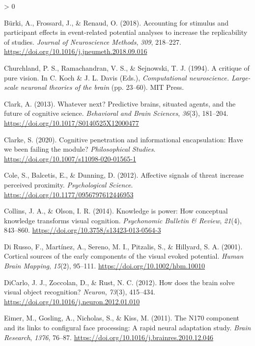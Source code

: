 \documentclass[
  english,
  man,floatsintext]{apa7}
\newlength{\cslhangindent}
\newenvironment{CSLReferences}[2] %
 {%
  \setlength{\parindent}{0pt}
  \ifodd #1 \everypar{\setlength{\hangindent}{\cslhangindent}}\ignorespaces\fi
  \ifnum #2 > 0
  \setlength{\parskip}{#2\baselineskip}
  \fi
 }%
 {}
\begin{document}
\begin{CSLReferences}{1}{0}
\leavevmode\hypertarget{ref-buxfcrki2018}{}%
Bürki, A., Frossard, J., \& Renaud, O. (2018). Accounting for stimulus and participant effects in event-related potential analyses to increase the replicability of studies. \emph{Journal of Neuroscience Methods}, \emph{309}, 218--227. \url{https://doi.org/10.1016/j.jneumeth.2018.09.016}

\leavevmode\hypertarget{ref-churchland1994}{}%
Churchland, P. S., Ramachandran, V. S., \& Sejnowski, T. J. (1994). A critique of pure vision. In C. Koch \& J. L. Davis (Eds.), \emph{Computational neuroscience. Large-scale neuronal theories of the brain} (pp. 23--60). MIT Press.

\leavevmode\hypertarget{ref-clark2013}{}%
Clark, A. (2013). Whatever next? {Predictive} brains, situated agents, and the future of cognitive science. \emph{Behavioral and Brain Sciences}, \emph{36}(3), 181--204. \url{https://doi.org/10.1017/S0140525X12000477}

\leavevmode\hypertarget{ref-clarke2020}{}%
Clarke, S. (2020). Cognitive penetration and informational encapsulation: Have we been failing the module? \emph{Philosophical Studies}. \url{https://doi.org/10.1007/s11098-020-01565-1}

\leavevmode\hypertarget{ref-cole2012}{}%
Cole, S., Balcetis, E., \& Dunning, D. (2012). Affective signals of threat increase perceived proximity. \emph{Psychological Science}. \url{https://doi.org/10.1177/0956797612446953}

\leavevmode\hypertarget{ref-collins2014}{}%
Collins, J. A., \& Olson, I. R. (2014). Knowledge is power: How conceptual knowledge transforms visual cognition. \emph{Psychonomic Bulletin \& Review}, \emph{21}(4), 843--860. \url{https://doi.org/10.3758/s13423-013-0564-3}

\leavevmode\hypertarget{ref-dirusso2001}{}%
Di Russo, F., Martínez, A., Sereno, M. I., Pitzalis, S., \& Hillyard, S. A. (2001). Cortical sources of the early components of the visual evoked potential. \emph{Human Brain Mapping}, \emph{15}(2), 95--111. \url{https://doi.org/10.1002/hbm.10010}

\leavevmode\hypertarget{ref-dicarlo2012}{}%
DiCarlo, J. J., Zoccolan, D., \& Rust, N. C. (2012). How does the brain solve visual object recognition? \emph{Neuron}, \emph{73}(3), 415--434. \url{https://doi.org/10.1016/j.neuron.2012.01.010}

\leavevmode\hypertarget{ref-eimer2011}{}%
Eimer, M., Gosling, A., Nicholas, S., \& Kiss, M. (2011). The {N170} component and its links to configural face processing: A rapid neural adaptation study. \emph{Brain Research}, \emph{1376}, 76--87. \url{https://doi.org/10.1016/j.brainres.2010.12.046}


\end{CSLReferences}
\end{document}
